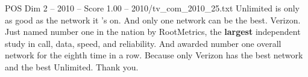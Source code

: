 \begin{textsample}{POS Dim 2 – 2010 – Score 1.00 – 2010/tv\_com\_2010\_25.txt}  \label{ex:f2_pos_048}
Unlimited is only as good as the network it 's on.
And only one network can be the best.
Verizon.
Just named number one in the nation by RootMetrics, the \textbf{largest} independent study in call, data, speed, and reliability.
And awarded number one overall network for the eighth time in a row.
Because only Verizon has the best network and the best Unlimited.
Thank you.

\end{textsample}
